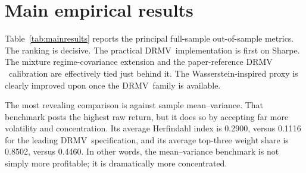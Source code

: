 \documentclass[11pt]{article}
\newcommand{\DRMV}{\ensuremath{\mathrm{DRMV}}}
\begin{document}
\section{Main empirical results}

Table~\ref{tab:mainresults} reports the principal full-sample out-of-sample metrics. The ranking is decisive. The practical \DRMV\ implementation is first on Sharpe. The mixture regime-covariance extension and the paper-reference \DRMV\ calibration are effectively tied just behind it. The Wasserstein-inspired proxy is clearly improved upon once the \DRMV\ family is available.

\begin{table}[H]
\centering
\caption{Principal out-of-sample results, 2016-01-07 to 2025-12-30. Returns and volatility are net of transaction costs.}
\label{tab:mainresults}
\small
\setlength{\tabcolsep}{4pt}
\end{table}

The most revealing comparison is against sample mean--variance. That benchmark posts the highest raw return, but it does so by accepting far more volatility and concentration. Its average Herfindahl index is 0.2900, versus 0.1116 for the leading \DRMV\ specification, and its average top-three weight share is 0.8502, versus 0.4460. In other words, the mean--variance benchmark is not simply more profitable; it is dramatically more concentrated.
\end{document}
